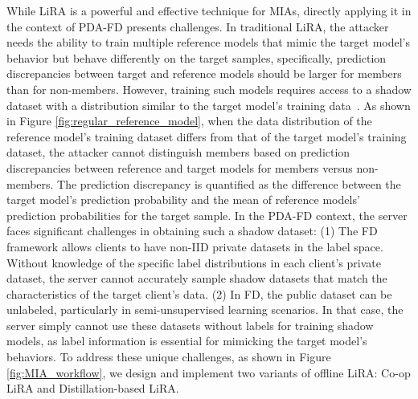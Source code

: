 While LiRA is a powerful and effective technique for MIAs, directly applying it in the context of PDA-FD presents challenges.
In traditional LiRA, the attacker needs the ability to train multiple reference models that mimic the target model's behavior but behave differently on the target samples, specifically, prediction discrepancies between target and reference models should be larger for members than for non-members.
However, training such models requires access to a shadow dataset with a distribution similar to the target model's training data~\cite{watson2021importance, carlini2022membership}.
As shown in Figure \ref{fig:regular_reference_model}, when the data distribution of the reference model's training dataset differs from that of the target model's training dataset, the attacker cannot distinguish members based on prediction discrepancies between reference and target models for members versus non-members. The prediction discrepancy is quantified as the difference between the target model's prediction probability and the mean of reference models' prediction probabilities for the target sample.
In the PDA-FD context, the server faces significant challenges in obtaining such a shadow dataset:
(1) The FD framework allows clients to have non-IID private datasets in the label space.
Without knowledge of the specific label distributions in each client's private dataset, the server cannot accurately sample shadow datasets that match the characteristics of the target client's data.
(2) In FD, the public dataset can be unlabeled, particularly in semi-unsupervised learning scenarios.
In that case, the server simply cannot use these datasets without labels for training shadow models, as label information is essential for mimicking the target model's behaviors.
To address these unique challenges, as shown in Figure \ref{fig:MIA_workflow}, we design and implement two variants of offline LiRA: Co-op LiRA and Distillation-based LiRA.



\iffalse
A reference model is a model that, in an ideal situation, closely mimics the behavior
of the target model but differs primarily in its predictions of the target sample. Co-op MIA requires the presence of such reference models. 
Training reference models necessitates access to a shadow dataset with a distribution similar to the target model's training data \cite{watson2021importance, carlini2022membership}.
In the PDA-FD context, the server faces significant challenges in obtaining such a shadow dataset:
(1)The FD framework allows for non-IID client private datasets, and the server lacks knowledge of their label distributions, complicating the sampling of matching shadow datasets.
(2)Clients' private datasets are typically sensitive. Moreover, each client protects these private data, limiting the server's direct access to similar datasets.
(3)While public datasets may have distributions similar to clients' private data, in some FD frameworks, these can be unlabeled, precluding their direct use as shadow datasets for training reference models.
To overcome these challenges, we developed two LiRA variants specifically for the PDA-FD framework: Co-op LiRA and Distillation-based LiRA.
\fi

